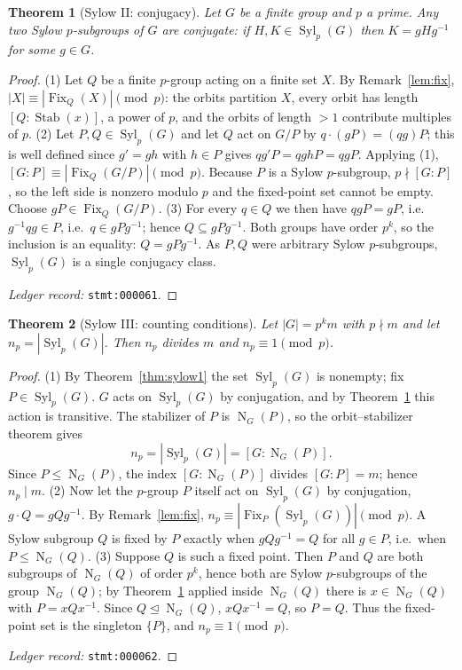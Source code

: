 \documentclass[11pt]{article}
\newtheorem{theorem}{Theorem}[section]
\theoremstyle{definition}
\theoremstyle{remark}
\newcommand{\Syl}{\operatorname{Syl}}
\newcommand{\Fix}{\operatorname{Fix}}
\newcommand{\Stab}{\operatorname{Stab}}
\newcommand{\Norm}{\operatorname{N}}
\begin{document}
\begin{theorem}[Sylow II: conjugacy]\label{thm:sylow2}
Let $G$ be a finite group and $p$ a prime. Any two Sylow $p$-subgroups of $G$ are conjugate: if $H,K\in\Syl_p(G)$ then $K=gHg^{-1}$ for some $g\in G$.
\end{theorem}

\begin{proof}
(1) Let $Q$ be a finite $p$-group acting on a finite set $X$. By Remark~\ref{lem:fix}, $|X|\equiv|\Fix_Q(X)|\pmod p$: the orbits partition $X$, every orbit has length $[Q:\Stab(x)]$, a power of $p$, and the orbits of length $>1$ contribute multiples of $p$.
(2) Let $P,Q\in\Syl_p(G)$ and let $Q$ act on $G/P$ by $q\cdot(gP)=(qg)P$; this is well defined since $g'=gh$ with $h\in P$ gives $qg'P=qghP=qgP$. Applying (1), $[G:P]\equiv|\Fix_Q(G/P)|\pmod p$. Because $P$ is a Sylow $p$-subgroup, $p\nmid[G:P]$, so the left side is nonzero modulo $p$ and the fixed-point set cannot be empty. Choose $gP\in\Fix_Q(G/P)$.
(3) For every $q\in Q$ we then have $qgP=gP$, i.e.\ $g^{-1}qg\in P$, i.e.\ $q\in gPg^{-1}$; hence $Q\subseteq gPg^{-1}$. Both groups have order $p^{k}$, so the inclusion is an equality: $Q=gPg^{-1}$. As $P,Q$ were arbitrary Sylow $p$-subgroups, $\Syl_p(G)$ is a single conjugacy class.

\emph{Ledger record:} \texttt{stmt:000061}.
\end{proof}

\begin{theorem}[Sylow III: counting conditions]\label{thm:sylow3}
Let $|G|=p^{k}m$ with $p\nmid m$ and let $n_p=|\Syl_p(G)|$. Then $n_p$ divides $m$ and $n_p\equiv 1\pmod p$.
\end{theorem}

\begin{proof}
(1) By Theorem~\ref{thm:sylow1} the set $\Syl_p(G)$ is nonempty; fix $P\in\Syl_p(G)$. $G$ acts on $\Syl_p(G)$ by conjugation, and by Theorem~\ref{thm:sylow2} this action is transitive. The stabilizer of $P$ is $\Norm_G(P)$, so the orbit--stabilizer theorem gives
\[
n_p=|\Syl_p(G)|=[G:\Norm_G(P)].
\]
Since $P\le\Norm_G(P)$, the index $[G:\Norm_G(P)]$ divides $[G:P]=m$; hence $n_p\mid m$.
(2) Now let the $p$-group $P$ itself act on $\Syl_p(G)$ by conjugation, $g\cdot Q=gQg^{-1}$. By Remark~\ref{lem:fix}, $n_p\equiv|\Fix_P(\Syl_p(G))|\pmod p$. A Sylow subgroup $Q$ is fixed by $P$ exactly when $gQg^{-1}=Q$ for all $g\in P$, i.e.\ when $P\le\Norm_G(Q)$.
(3) Suppose $Q$ is such a fixed point. Then $P$ and $Q$ are both subgroups of $\Norm_G(Q)$ of order $p^{k}$, hence both are Sylow $p$-subgroups of the group $\Norm_G(Q)$; by Theorem~\ref{thm:sylow2} applied inside $\Norm_G(Q)$ there is $x\in\Norm_G(Q)$ with $P=xQx^{-1}$. Since $Q\trianglelefteq\Norm_G(Q)$, $xQx^{-1}=Q$, so $P=Q$. Thus the fixed-point set is the singleton $\{P\}$, and $n_p\equiv 1\pmod p$.

\emph{Ledger record:} \texttt{stmt:000062}.
\end{proof}
\end{document}
